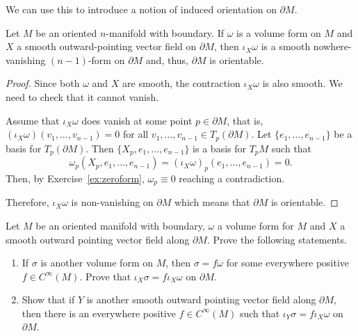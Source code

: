 We can use this to introduce a notion of induced orientation on $\partial M$.

\begin{proposition}
	Let $M$ be an oriented $n$-manifold with boundary.
	If $\omega$ is a volume form on $M$ and $X$ a smooth outward-pointing vector field on $\partial M$, then $\iota_X\omega$ is a smooth nowhere-vanishing $(n-1)$-form on $\partial M$ and, thus, $\partial M$ is orientable.
\end{proposition}
\begin{proof}
	Since both $\omega$ and $X$ are smooth, the contraction $\iota_X\omega$ is also smooth.
	We need to check that it cannot vanish.

	Assume that $\iota_X\omega$ does vanish at some point $p\in\partial M$, that is, $(\iota_X\omega)(v_1, \ldots, v_{n-1}) = 0$ for all $v_1, \ldots, v_{n-1}\in T_p(\partial M)$.
	Let $\{e_1,\ldots,e_{n-1}\}$ be a basis for $T_p(\partial M)$.
	Then $\{X_p,e_1,\ldots,e_{n-1}\}$ is a basis for $T_p M$ such that
	\begin{equation}
		\omega_p(X_p, e_1, \ldots, e_{n-1}) = (\iota_X\omega)_p(e_1, \ldots, e_{n-1}) = 0.
	\end{equation}
	Then, by Exercise~\ref{ex:zeroform}, $\omega_p\equiv0$ reaching a contradiction.

	Therefore, $\iota_X\omega$ is non-vanishing on $\partial M$ which means that $\partial M$ is orientable.
\end{proof}

\begin{exercise}\label{ex:vfshape}
	Let $M$ be an oriented manifold with boundary, $\omega$ a volume form for $M$ and $X$ a smooth outward pointing vector field along $\partial M$.
	Prove the following statements.
	\begin{enumerate}
		\item If $\sigma$ is another volume form on $M$, then $\sigma = f\omega$ for some everywhere positive $f\in C^\infty(M)$. Prove that  $\iota_X\sigma = f\iota_X \omega$ on $\partial M$.
		\item Show that if $Y$ is another smooth outward pointing vector field along $\partial M$, then there is an everywhere positive $f\in C^\infty(M)$ such that $\iota_Y\sigma = f \iota_X \omega$ on $\partial M$.
	\end{enumerate}
\end{exercise}

